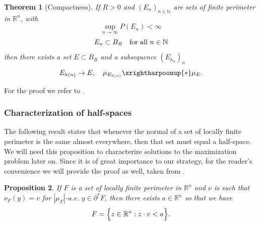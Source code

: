 \documentclass[artcle, 11pt, reqno]{amsart}
\numberwithin{equation}{section}
\newcommand{\R}{\mathbb{R}}
\newcommand{\N}{\mathbb{N}}
\newcommand{\ninfty}{n \rightarrow \infty}
\theoremstyle{plain}
\newtheorem{theorem}{Theorem}
\newtheorem{proposition}[theorem]{Proposition}
\theoremstyle{definition}
\theoremstyle{remark}
\begin{document}
	\begin{theorem}[Compactness] \label{ExistTh}
		If $R>0$ and $(E_n)_{n \in \N}$ are sets of finite perimeter in $\R^n$, with
		\begin{equation} \label{eq:ExistTh_SupCond}
			\sup_{\ninfty} P(E_n) < \infty
		\end{equation}
		\begin{equation} \label{eq:ExistTh_BallCond}
			E_n \subset B_R \quad \textnormal{for all } n \in \N
		\end{equation}
		then there exists a set $E \subset B_R$ and a subsequence $(E_{h_n})_n$
		\[
		E_{h(n)} \rightarrow E, \quad \mu_{E_{h(n)}} \xrightharpoonup{\ast} \mu_E.
		\]
	\end{theorem}
	For the proof we refer to \cite[Theorem 12.26]{maggi2012sets}.
	
	\subsubsection{Characterization of half-spaces} \label{subsec:halfspace}
	The following result states that whenever the normal of a set of locally finite perimeter is the same almost everywhere, then that set must equal a half-space. We will need this proposition to characterize solutions to the maximization problem later on. Since it is of great importance to our strategy, for the reader's convenience we will provide the proof as well, taken from \cite{maggi2012sets}.
	
	\begin{proposition}
		\label{halfspace}
		If $F$ is a set of locally finite perimeter in $\R^n$ and $\nu$ is such that $\nu_F(y)=v$ for $|\mu_F|$-a.e. $y \in \partial^\ast F$, then there exists $a \in \R^n$ so that we have 
		\[
		F = \Bigl\{ z \in \R^n : z \cdot v < a \Bigr\}.
		\]
	\end{proposition}
	
\end{document}
